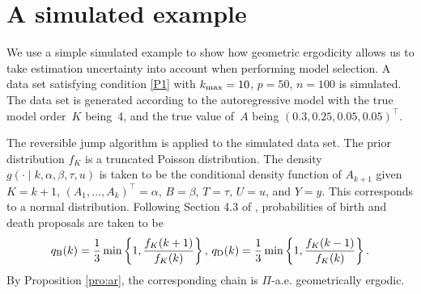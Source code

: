 \documentclass[12pt]{article}
\begin{document}
\section{A simulated example} \label{sssec:robustsimulate}

We use a simple simulated example to show how geometric ergodicity allows us to take estimation uncertainty into account when performing model selection.
A data set satisfying condition \ref{P1} with $k_{\scriptsize \mbox{max}} = 10$, $p = 50$, $n = 100$ is simulated.
The data set is generated according to the autoregressive model with the true model order~$K$ being~4, and the true value of~$A$ being $(0.3, 0.25, 0.05, 0.05)^{\top}$.

The reversible jump algorithm is applied to the simulated data set.
The prior distribution $f_K$ is a truncated Poisson distribution.
The density $g(\cdot \mid k, \alpha, \beta, \tau, u)$ is taken to be the conditional density function of $A_{k+1}$ given $K=k+1$, $(A_1, \dots, A_k)^{\top} = \alpha$, $B = \beta$, $T = \tau$, $U = u$, and $Y = y$.
This corresponds to a normal distribution.
Following Section 4.3 of \cite{green1995reversible}, probabilities of birth and death proposals are taken to be
\[
q_{\scriptsize\mbox{B}}(k) = \frac{1}{3} \min \left\{ 1, \frac{f_K(k+1)}{f_K(k)} \right\}, \, q_{\scriptsize\mbox{D}}(k) = \frac{1}{3} \min \left\{ 1, \frac{f_K(k-1)}{f_K(k)} \right\}.
\]
By Proposition \ref{pro:ar}, the corresponding chain is $\Pi$-a.e. geometrically ergodic.


\end{document}
